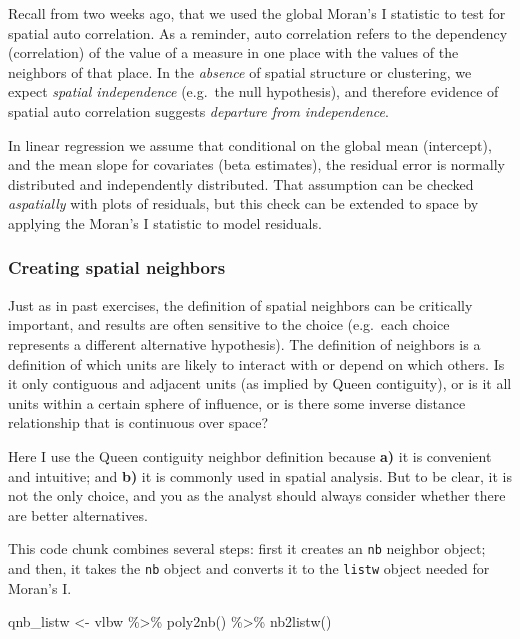 \documentclass[
]{book}
\newenvironment{Shaded}{\begin{snugshade}}{\end{snugshade}}
\newcommand{\FunctionTok}[1]{\textcolor[rgb]{0.00,0.00,0.00}{#1}}
\newcommand{\NormalTok}[1]{#1}
\newcommand{\OtherTok}[1]{\textcolor[rgb]{0.56,0.35,0.01}{#1}}
\newcommand{\SpecialCharTok}[1]{\textcolor[rgb]{0.00,0.00,0.00}{#1}}
\begin{document}
Recall from two weeks ago, that we used the global Moran's I statistic to test for spatial auto correlation. As a reminder, auto correlation refers to the dependency (correlation) of the value of a measure in one place with the values of the neighbors of that place. In the \emph{absence} of spatial structure or clustering, we expect \emph{spatial independence} (e.g.~the null hypothesis), and therefore evidence of spatial auto correlation suggests \emph{departure from independence}.

In linear regression we assume that conditional on the global mean (intercept), and the mean slope for covariates (beta estimates), the residual error is normally distributed and independently distributed. That assumption can be checked \emph{aspatially} with plots of residuals, but this check can be extended to space by applying the Moran's I statistic to model residuals.

\hypertarget{creating-spatial-neighbors}{%
\subsubsection{Creating spatial neighbors}\label{creating-spatial-neighbors}}

Just as in past exercises, the definition of spatial neighbors can be critically important, and results are often sensitive to the choice (e.g.~each choice represents a different alternative hypothesis). The definition of neighbors is a definition of which units are likely to interact with or depend on which others. Is it only contiguous and adjacent units (as implied by Queen contiguity), or is it all units within a certain sphere of influence, or is there some inverse distance relationship that is continuous over space?

Here I use the Queen contiguity neighbor definition because \textbf{a)} it is convenient and intuitive; and \textbf{b)} it is commonly used in spatial analysis. But to be clear, it is not the only choice, and you as the analyst should always consider whether there are better alternatives.

This code chunk combines several steps: first it creates an \texttt{nb} neighbor object; and then, it takes the \texttt{nb} object and converts it to the \texttt{listw} object needed for Moran's I.

\begin{Shaded}
\begin{Highlighting}[]
\NormalTok{qnb\_listw }\OtherTok{\textless{}{-}}\NormalTok{ vlbw }\SpecialCharTok{\%\textgreater{}\%}
  \FunctionTok{poly2nb}\NormalTok{() }\SpecialCharTok{\%\textgreater{}\%}
  \FunctionTok{nb2listw}\NormalTok{()}
\end{Highlighting}
\end{Shaded}
\end{document}
